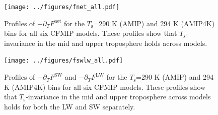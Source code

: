 \documentclass[10pt]{article}
\newcommand{\ppt}{\ensuremath{\partial_T}}
\newcommand{\FLW}{\ensuremath{F^\mathrm{LW}}}
\newcommand{\FSW}{\ensuremath{F^\mathrm{SW}}}
\newcommand{\Fnet}{\ensuremath{F^\mathrm{net}}}
\newcommand{\Ts}{\ensuremath{T_\mathrm{s}}}
\begin{document}
\begin{figure}[h]
	\begin{center}
			\texttt{[image: ../figures/fnet\_all.pdf]}
		\caption{ Profiles of $-\ppt \Fnet$ for the \Ts=290 K (AMIP) and 294 K (AMIP4K) bins for all six CFMIP models. These profiles show that \Ts-invariance in the mid and upper troposphere holds across models.
		\label{fnet_all}
		}
	\end{center}
\end{figure}

\begin{figure}[h]
	\begin{center}
			\texttt{[image: ../figures/fswlw\_all.pdf]}
		\caption{ Profiles of $-\ppt \FSW$ and $-\ppt \FLW$ for the \Ts=290 K (AMIP) and 294 K (AMIP4K) bins for all six CFMIP models. These profiles show that \Ts-invariance in the mid and upper troposphere across models holds for both the LW and SW separately. 
		\label{fswlw_all}
		}
	\end{center}
\end{figure}
\end{document}

